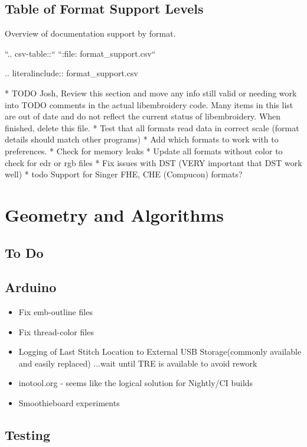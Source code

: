 \documentclass[a4paper]{report}
\begin{document}
\subsection{Table of Format Support Levels}

Overview of documentation support by format.

``.. csv-table::``
``:file: format\_support.csv``

.. literalinclude:: format\_support.csv

* TODO Josh, Review this section and move any info still valid or needing work into TODO comments in the actual libembroidery code. Many items in this list are out of date and do not reflect the current status of libembroidery. When finished, delete this file.
  * Test that all formats read data in correct scale (format details should match other programs)
  * Add which formats to work with to preferences.
  * Check for memory leaks
  * Update all formats without color to check for edr or rgb files
  * Fix issues with DST (VERY important that DST work well)
* todo Support for Singer FHE, CHE (Compucon) formats?

\section{Geometry and Algorithms}

\subsection{To Do}

\subsection{Arduino}

\begin{itemize}
\item Fix emb-outline files
\item Fix thread-color files
\item Logging of Last Stitch Location to External USB Storage(commonly available and easily replaced) ...wait until TRE is available to avoid rework
\item inotool.org - seems like the logical solution for Nightly/CI builds
\item Smoothieboard experiments
\end{itemize}

\subsection{Testing}
\end{document}
